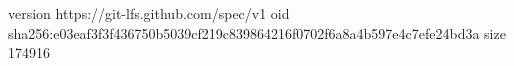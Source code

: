 version https://git-lfs.github.com/spec/v1
oid sha256:e03eaf3f3f436750b5039cf219c839864216f0702f6a8a4b597e4c7efe24bd3a
size 174916
